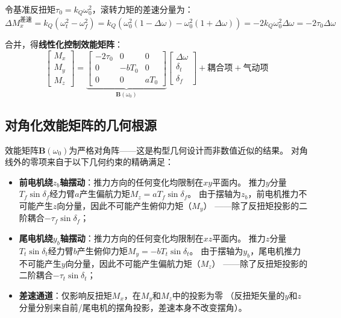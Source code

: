 \documentclass[a4paper,12pt]{ctexart}
\theoremstyle{plain}
\theoremstyle{definition}
\begin{document}
令基准反扭矩$\tau_0 = k_Q \omega_0^2$，滚转力矩的差速分量为：
\begin{equation}
    \Delta M_x^{\text{差速}} = k_Q (\omega_t^2 - \omega_f^2)
    = k_Q (\omega_0^2(1-\Delta\omega) - \omega_0^2(1+\Delta\omega))
    = -2 k_Q \omega_0^2 \Delta\omega
    = -2 \tau_0 \Delta\omega
    \label{eq:differential_roll}
\end{equation}

合并，得\textbf{线性化控制效能矩阵}：
\begin{equation}
    \boxed{
    \begin{bmatrix} M_x \\ M_y \\ M_z \end{bmatrix}
    =
    \underbrace{
    \begin{bmatrix}
        -2\tau_0 & 0 & 0 \\
        0 & -b T_0 & 0 \\
        0 & 0 & a T_0
    \end{bmatrix}
    }_{\bm{B}(\omega_0)}
    \begin{bmatrix} \Delta\omega \\ \delta_t \\ \delta_f \end{bmatrix}
    +
    \text{耦合项} + \text{气动项}
    }
    \label{eq:effectiveness_matrix}
\end{equation}

\subsection{对角化效能矩阵的几何根源}

效能矩阵$\bm{B}(\omega_0)$为严格对角阵——这是构型几何设计而非数值近似的结果。
对角线外的零项来自于以下几何约束的精确满足：

\begin{itemize}
    \item \textbf{前电机绕$z_b$轴摆动}：推力方向的任何变化均限制在$xy$平面内。
          推力$y$分量$T_f \sin\delta_f$经力臂$a$产生偏航力矩$M_z = a T_f \sin\delta_f$。
          由于摆轴为$z_b$，前电机推力不可能产生$z$向分量，因此不可能产生俯仰力矩（$M_y$）
          ——除了反扭矩投影的二阶耦合$-\tau_f\sin\delta_f$；
    \item \textbf{尾电机绕$y_b$轴摆动}：推力方向的任何变化均限制在$xz$平面内。
          推力$z$分量$T_t\sin\delta_t$经力臂$b$产生俯仰力矩$M_y = -b T_t\sin\delta_t$。
          由于摆轴为$y_b$，尾电机推力不可能产生$y$向分量，因此不可能产生偏航力矩（$M_z$）
          ——除了反扭矩投影的二阶耦合$-\tau_t\sin\delta_t$；
    \item \textbf{差速通道}：仅影响反扭矩$M_x$，在$M_y$和$M_z$中的投影为零
          （反扭矩矢量的$y$和$z$分量分别来自前/尾电机的摆角投影，差速本身不改变摆角）。
\end{itemize}
\end{document}
